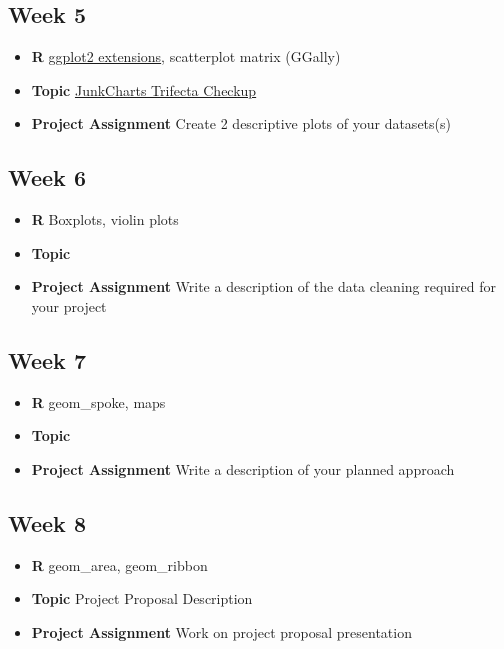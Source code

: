 \documentclass[]{book}
\providecommand{\tightlist}{%
  \setlength{\itemsep}{0pt}\setlength{\parskip}{0pt}}
\begin{document}
\subsection*{Week 5}\label{week-5}

\begin{itemize}
\tightlist
\item
  \textbf{R} \href{http://www.ggplot2-exts.org/gallery}{ggplot2
  extensions}, scatterplot matrix (GGally)
\item
  \textbf{Topic} \protect\hyperlink{trifecta}{JunkCharts Trifecta
  Checkup}
\item
  \textbf{Project Assignment} Create 2 descriptive plots of your
  datasets(s)
\end{itemize}

\subsection*{Week 6}\label{week-6}

\begin{itemize}
\tightlist
\item
  \textbf{R} Boxplots, violin plots
\item
  \textbf{Topic}
\item
  \textbf{Project Assignment} Write a description of the data cleaning
  required for your project
\end{itemize}

\subsection*{Week 7}\label{week-7}

\begin{itemize}
\tightlist
\item
  \textbf{R} geom\_spoke, maps
\item
  \textbf{Topic}
\item
  \textbf{Project Assignment} Write a description of your planned
  approach
\end{itemize}

\subsection*{Week 8}\label{week-8}

\begin{itemize}
\tightlist
\item
  \textbf{R} geom\_area, geom\_ribbon
\item
  \textbf{Topic} Project Proposal Description
\item
  \textbf{Project Assignment} Work on project proposal presentation
\end{itemize}
\end{document}
